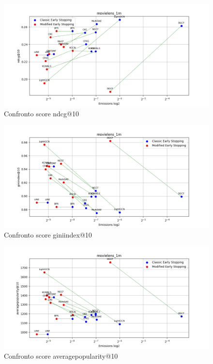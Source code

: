\begin{figure}[H]
    \centering
    \includegraphics[width=\linewidth, trim=0 0 0 0]{images/ndcg@10_movielens_1m_40_6_comparison.png}
    \caption{Confronto score ndcg@10}
    
\end{figure}

\begin{figure}[H]
    \centering
    \includegraphics[width=\linewidth, trim=0 0 0 0]{images/giniindex@10_movielens_1m_40_6_comparison.png}
    \caption{Confronto score giniindex@10}
\end{figure}

\begin{figure}[H]
    \centering
    \includegraphics[width=\linewidth, trim=0 0 0 0]{images/averagepopularity@10_movielens_1m_40_6_comparison.png}
    \caption{Confronto score averagepopularity@10}
\end{figure}


